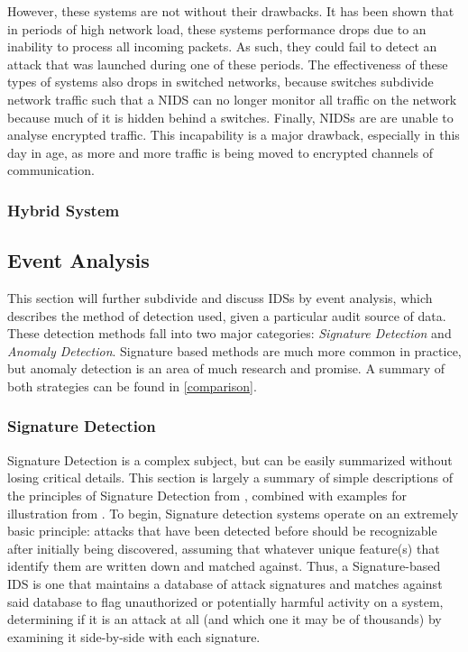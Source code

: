 \documentclass{acm_proc_article-sp}
\begin{document}
    		However, these systems are not without their drawbacks. It has been shown that in periods of high network load, these systems performance drops due to an inability to process all incoming packets. As such, they could fail to detect an attack that was launched during one of these periods. The effectiveness of these types of systems also drops in switched networks, because switches subdivide network traffic such that a NIDS can no longer monitor all traffic on the network because much of it is hidden behind a switches. Finally, NIDSs are are unable to analyse encrypted traffic. This incapability is a major drawback, especially in this day in age, as more and more traffic is being moved to encrypted channels of communication. 		
    	\subsubsection{Hybrid System}
    \subsection{Event Analysis}
   	This section will further subdivide and discuss IDSs by event analysis, which describes the method of detection used, given a particular audit source of data. These detection methods fall into two major categories: \emph{Signature Detection} and \emph{Anomaly Detection}. Signature based methods are much more common in practice, but anomaly detection is an area of much research and promise. A summary of both strategies can be found in \ref{comparison}.
	    \subsubsection{Signature Detection} 
	    	Signature Detection is a complex subject, but can be easily summarized without losing critical details. This section is largely a summary of simple descriptions of the principles of Signature Detection from \cite{Taylor2006}, combined with examples for illustration from \cite{Labs1999}. To begin, Signature detection systems operate on an extremely basic principle: attacks that have been detected before should be recognizable after initially being discovered, assuming that whatever unique feature(s) that identify them are written down and matched against. Thus, a Signature-based IDS is one that maintains a database of attack signatures and matches against said database to flag unauthorized or potentially harmful activity on a system, determining if it is an attack at all (and which one it may be of thousands) by examining it side-by-side with each signature. 
	    	
\end{document}
